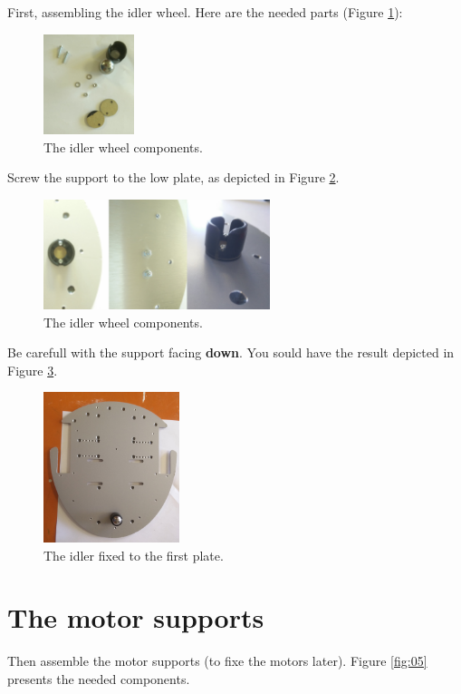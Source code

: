 \documentclass[10pt,a4paper]{report}   %
\begin{document}
First, assembling the idler wheel. Here are the needed parts (Figure \ref{fig:02}):

\begin{figure}[H]
\center
\includegraphics[width=100px]{images/02.jpg}
\caption{The idler wheel components.}
\label{fig:02}
\end{figure}

Screw the support to the low plate, as depicted in Figure \ref{fig:03}.

\begin{figure}[H]
\center
\includegraphics[width=250px]{images/03.jpg}
\caption{The idler wheel components.}
\label{fig:03}
\end{figure}

Be carefull with the support facing \textbf{down}. You sould have the result depicted in Figure \ref{fig:04}.

\begin{figure}[H]
\center
\includegraphics[width=150px]{images/04.jpg}
\caption{The idler fixed to the first plate.}
\label{fig:04}
\end{figure}

\section{The motor supports}

Then assemble the motor supports (to fixe the motors later). Figure \ref{fig:05} presents the needed components.
\end{document}
